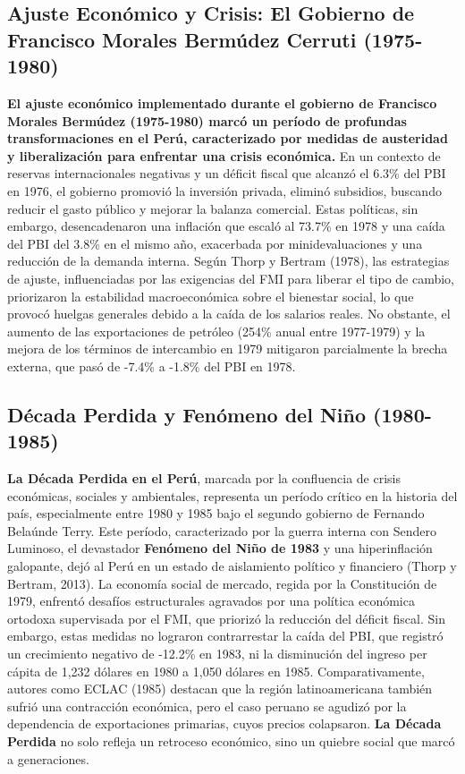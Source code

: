 \documentclass[
  jou,
  floatsintext,
  longtable,
  a4paper,
  nolmodern,
  notxfonts,
  notimes,
  colorlinks=true,linkcolor=blue,citecolor=blue,urlcolor=blue]{apa7}
\begin{document}
\subsection{Ajuste Económico y Crisis: El Gobierno de Francisco Morales
Bermúdez Cerruti
(1975-1980)}\label{ajuste-econuxf3mico-y-crisis-el-gobierno-de-francisco-morales-bermuxfadez-cerruti-1975-1980}

\textbf{El ajuste económico implementado durante el gobierno de
Francisco Morales Bermúdez (1975-1980) marcó un período de profundas
transformaciones en el Perú, caracterizado por medidas de austeridad y
liberalización para enfrentar una crisis económica.} En un contexto de
reservas internacionales negativas y un déficit fiscal que alcanzó el
6.3\% del PBI en 1976, el gobierno promovió la inversión privada,
eliminó subsidios, buscando reducir el gasto público y mejorar la
balanza comercial. Estas políticas, sin embargo, desencadenaron una
inflación que escaló al 73.7\% en 1978 y una caída del PBI del 3.8\% en
el mismo año, exacerbada por minidevaluaciones y una reducción de la
demanda interna. Según Thorp y Bertram (1978), las estrategias de
ajuste, influenciadas por las exigencias del FMI para liberar el tipo de
cambio, priorizaron la estabilidad macroeconómica sobre el bienestar
social, lo que provocó huelgas generales debido a la caída de los
salarios reales. No obstante, el aumento de las exportaciones de
petróleo (254\% anual entre 1977-1979) y la mejora de los términos de
intercambio en 1979 mitigaron parcialmente la brecha externa, que pasó
de -7.4\% a -1.8\% del PBI en 1978.

\subsection{Década Perdida y Fenómeno del Niño
(1980-1985)}\label{duxe9cada-perdida-y-fenuxf3meno-del-niuxf1o-1980-1985}

\textbf{La Década Perdida en el Perú}, marcada por la confluencia de
crisis económicas, sociales y ambientales, representa un período crítico
en la historia del país, especialmente entre 1980 y 1985 bajo el segundo
gobierno de Fernando Belaúnde Terry. Este período, caracterizado por la
guerra interna con Sendero Luminoso, el devastador \textbf{Fenómeno del
Niño de 1983} y una hiperinflación galopante, dejó al Perú en un estado
de aislamiento político y financiero (Thorp y Bertram, 2013). La
economía social de mercado, regida por la Constitución de 1979, enfrentó
desafíos estructurales agravados por una política económica ortodoxa
supervisada por el FMI, que priorizó la reducción del déficit fiscal.
Sin embargo, estas medidas no lograron contrarrestar la caída del PBI,
que registró un crecimiento negativo de -12.2\% en 1983, ni la
disminución del ingreso per cápita de 1,232 dólares en 1980 a 1,050
dólares en 1985. Comparativamente, autores como ECLAC (1985) destacan
que la región latinoamericana también sufrió una contracción económica,
pero el caso peruano se agudizó por la dependencia de exportaciones
primarias, cuyos precios colapsaron. \textbf{La Década Perdida} no solo
refleja un retroceso económico, sino un quiebre social que marcó a
generaciones.
\end{document}
